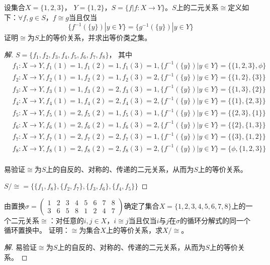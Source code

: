 \documentclass{article}
\begin{document}
\begin{CJK}{UTF8}{gbsn}
 \begin{Exercise}
  设集合$X = \{1,2,3\}$， $Y = \{1,2\}$，$S = \{f|f:X \to Y\}$。$S$上的二元关系$\cong$定义如下：$\forall f,g\in S$，$f \cong g$当且仅当\[\{f^{-1}(\{y\}) | y \in Y\} = \{g^{-1}(\{y\})|y \in Y\}\]证明$\cong$为$S$上的等价关系，并求出等价类之集。  
\end{Exercise}
\begin{proof}[解]
    
    
  $S=\{f_1,f_2,f_3,f_4,f_5,f_6,f_7,f_8\}$，
  其中
  \begin{align*}
    &f_1:X\to Y, f_1(1)=1,f_1(2)=1,f_1(3) = 1, \{f^{-1}(\{y\}) | y \in Y\}=\{\{1,2,3\},\phi\}\\
    &f_2:X\to Y, f_2(1)=1,f_2(2)=1,f_2(3) = 2, \{f^{-1}(\{y\}) | y \in Y\}=\{\{1,2\},\{3\}\}\\
    &f_3:X\to Y, f_3(1)=1,f_3(2)=2,f_3(3) = 1, \{f^{-1}(\{y\}) | y \in Y\}=\{\{1,3\},\{2\}\}\\
    &f_4:X\to Y, f_4(1)=1,f_4(2)=2,f_4(3) = 2, \{f^{-1}(\{y\}) | y \in Y\}=\{\{1\},\{2,3\}\}\\
    &f_5:X\to Y, f_5(1)=2,f_5(2)=1,f_5(3) = 1, \{f^{-1}(\{y\}) | y \in Y\}=\{\{2,3\},\{1\}\}\\
    &f_6:X\to Y, f_6(1)=2,f_6(2)=1,f_6(3) = 2, \{f^{-1}(\{y\}) | y \in Y\}=\{\{2\},\{1,3\}\}\\
    &f_7:X\to Y, f_7(1)=2,f_7(2)=2,f_7(3) = 1, \{f^{-1}(\{y\}) | y \in Y\}=\{\{3\},\{1,2\}\}\\
    &f_8:X\to Y, f_8(1)=2,f_8(2)=2,f_8(3) = 2, \{f^{-1}(\{y\}) | y \in Y\}=\{\phi,\{1,2,3\}\}\\
  \end{align*}

      易验证$\cong$为$S$上的自反的、对称的、传递的二元关系，从而为$S$上的等价关系。

  $S/\cong=\{\{f_1,f_8\},\{f_2,f_7\},\{f_3,f_6\},\{f_4,f_5\}\}$
\end{proof}


\begin{Exercise}
由置换$\sigma=\begin{pmatrix}1&2&3&4&5&6&7&8\\3&6&5&8&1&2&4&7\end{pmatrix}$确定了集合$X=\{1,2,3,4,5,6,7,8\}$上的一个二元关系$\cong$：对任意的$i,j\in X$，$i\cong j$当且仅当$i$与$j$在$\sigma$的循环分解式的同一个循环置换中。
证明：$\cong$为集合$X$上的等价关系，求$X/\cong$。
\end{Exercise}
\begin{proof}[解]
  易验证$\cong$为$S$上的自反的、对称的、传递的二元关系，从而为$S$上的等价关系。


\end{proof}
\end{CJK}
\end{document}
